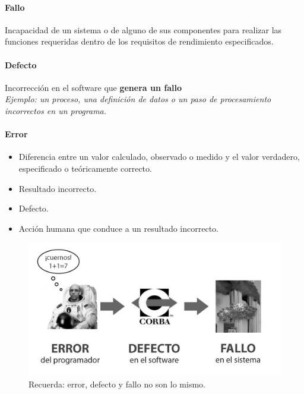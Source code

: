  
\paragraph{Fallo} Incapacidad de un sistema o de alguno de sus componentes para realizar las funciones requeridas dentro de los requisitos de rendimiento especificados.
 
\paragraph{Defecto} Incorrección en el software que \textbf{genera un fallo}\\
\textit{Ejemplo: un proceso, una definición de datos o un paso de procesamiento incorrectos en un programa.}
\paragraph{Error}
\begin{itemize}
    \item Diferencia entre un valor calculado, observado o medido y el valor verdadero, especificado o teóricamente correcto.
    \item Resultado incorrecto.
    \item Defecto.
    \item Acción humana que conduce a un resultado incorrecto.
\end{itemize}

\begin{figure}[H]
  \centering
  \includegraphics[width=0.8\linewidth]{Resources/cuernos}
  \caption{Recuerda: error, defecto y fallo no son lo mismo.}
  \label{fig:cuernos}
\end{figure}


